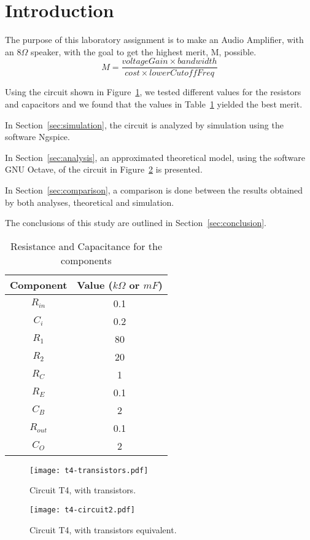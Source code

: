 \section{Introduction}
\label{sec:introduction}

The purpose of this laboratory assignment is to make an Audio Amplifier, with an $8\Omega$ speaker, with the goal to get the highest merit, M, possible.
$$ M = \frac{voltageGain \times bandwidth}{cost \times lowerCutoffFreq}$$

Using the circuit shown in Figure~\ref{fig:t4-transistors}, we tested different values for the resistors and capacitors and we found that the values in Table~\ref{tab:values} yielded the best merit.

In Section~\ref{sec:simulation}, the circuit is analyzed by simulation using the software Ngspice. 

In Section~\ref{sec:analysis}, an approximated theoretical model, using the software GNU Octave, of the circuit in Figure~\ref{fig:t4-equiv} is presented. 

In Section~\ref{sec:comparison}, a comparison is done between the results obtained by both analyses, theoretical and simulation.

The conclusions of this study are outlined in Section~\ref{sec:conclusion}.

\begin{table}[ht!]
    \centering
    \begin{tabular}{c c}
    \toprule
    Component & Value ($k\Omega$ or $mF$) \\ \midrule
    $R_{in}$  & 0.1 \\
    $C_i$     & 0.2 \\
    $R_1$     & 80  \\
    $R_2$     & 20  \\
    $R_C$     & 1   \\
    $R_E$     & 0.1 \\
    $C_B$     & 2   \\
    $R_{out}$ & 0.1 \\
    $C_O$     & 2   \\
    \end{tabular}
    \label{tab:values}
    \caption{Resistance and Capacitance for the components}
\end{table}


\begin{figure}[ht!]
\centering
    \texttt{[image: t4-transistors.pdf]}
\caption{Circuit T4, with transistors.}
\label{fig:t4-transistors}
\end{figure}

\begin{figure}[ht!]
\centering
    \texttt{[image: t4-circuit2.pdf]}
\caption{Circuit T4, with transistors equivalent.}
\label{fig:t4-equiv}
\end{figure}

\FloatBarrier
\clearpage
